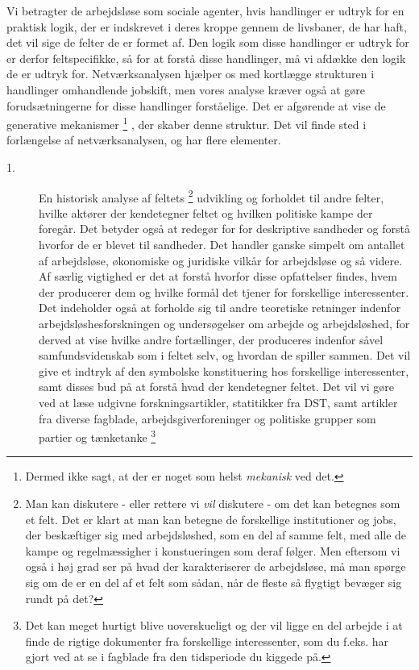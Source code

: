 Vi betragter de arbejdsløse som sociale agenter, hvis handlinger er udtryk for en praktisk logik, der er indskrevet i deres kroppe gennem de livsbaner, de har haft, det vil sige de felter de er formet af. Den logik som disse handlinger er udtryk for er derfor feltspecifikke, så for at forstå disse handlinger, må vi afdække den logik de er udtryk for.  Netværksanalysen hjælper os med kortlægge strukturen i handlinger omhandlende jobskift, men vores analyse kræver også at gøre forudsætningerne for disse handlinger forståelige. Det er afgørende at vise de generative mekanismer%
\footnote{Dermed ikke sagt, at der er noget som helst \emph{mekanisk} ved det.}%
%
, der skaber denne struktur. Det vil finde sted i forlængelse af netværksanalysen, og har flere elementer.

%
\begin{description}
  \item[1.] En historisk analyse af feltets%
  \footnote{Man kan diskutere - eller rettere vi \emph{vil} diskutere - om det kan betegnes som et felt. Det er klart at man kan betegne de forskellige institutioner og jobs, der beskæftiger sig med arbejdsløshed, som en del af samme felt, med alle de kampe og regelmæssigher i konstueringen som deraf følger. Men eftersom vi også i høj grad ser på hvad der karakteriserer de arbejdsløse, må man spørge sig om de er en del af et felt som sådan, når de fleste så flygtigt bevæger sig rundt på det?}%
   udvikling og forholdet til andre felter, hvilke aktører der kendetegner feltet og hvilken politiske kampe der foregår. Det betyder også at redegør for for deskriptive sandheder og forstå hvorfor de er blevet til sandheder. Det handler ganske simpelt om antallet af arbejdsløse, økonomiske og juridiske vilkår for arbejdsløse og så videre. Af særlig vigtighed er det at forstå hvorfor disse opfattelser findes, hvem der producerer dem og hvilke formål det tjener for forskellige interessenter. Det indeholder også at forholde sig til andre teoretiske retninger indenfor arbejdsløshesforskningen og undersøgelser om arbejde og arbejdsløshed, for derved at vise hvilke andre fortællinger, der produceres indenfor såvel samfundsvidenskab som i feltet selv, og hvordan de spiller sammen. Det vil give et indtryk af den symbolske konstituering hos forskellige interessenter, samt disses bud på at forstå hvad der kendetegner feltet. Det vil vi gøre ved at læse udgivne forskningsartikler, statitikker fra DST, samt artikler fra diverse fagblade, arbejdsgiverforeninger og politiske grupper som partier og tænketanke%
%
\footnote{Det kan meget hurtigt blive uoverskueligt og der vil ligge en del arbejde i at finde de rigtige dokumenter fra forskellige interessenter, som du f.eks. har gjort ved at se i fagblade fra den tidsperiode du kiggede på.}%

\end{description}
